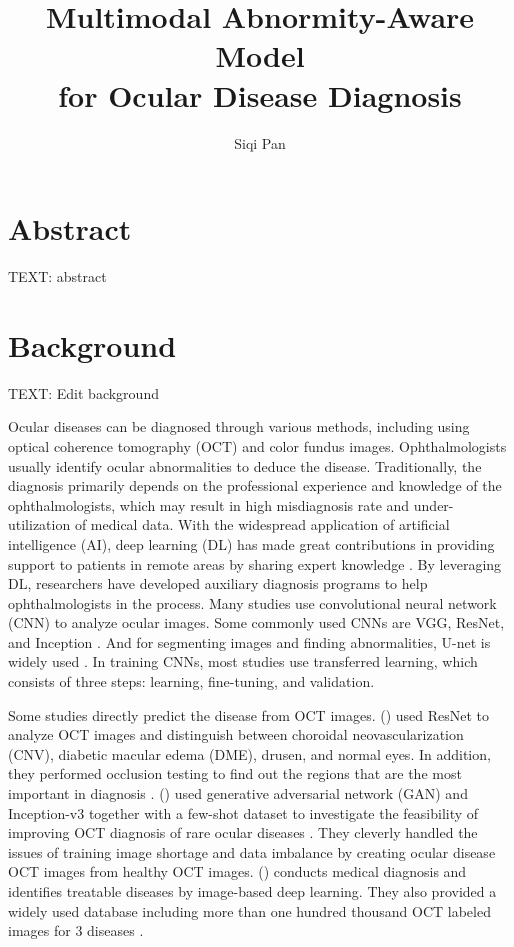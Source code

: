 \documentclass{article}
\newcommand{\authyear}[1]{\citeauthor{#1} (\citeyear{#1})}
\begin{document}
	\title{\vspace{-2.25cm} Multimodal Abnormity-Aware Model\\for Ocular Disease Diagnosis}
	\author{Siqi Pan}
	\date{}
	\maketitle
	
	\section*{Abstract}
	
	TEXT: abstract
	
	\section{Background}
	
	TEXT: Edit background
	
	Ocular diseases can be diagnosed through various methods, including using optical coherence tomography (OCT) and color fundus images. Ophthalmologists usually identify ocular abnormalities to deduce the disease. Traditionally, the diagnosis primarily depends on the professional experience and knowledge of the ophthalmologists, which may result in high misdiagnosis rate and under-utilization of medical data. With the widespread application of artificial intelligence (AI), deep learning (DL) has made great contributions in providing support to patients in remote areas by sharing expert knowledge \autocite{Ichhpujani_Thakur_2021}. By leveraging DL, researchers have developed auxiliary diagnosis programs to help ophthalmologists in the process. Many studies use convolutional neural network (CNN) to analyze ocular images. Some commonly used CNNs are VGG, ResNet, and Inception \autocite{daich2023artificial}. And for segmenting images and finding abnormalities, U-net is widely used \autocite{Ronneberger_Fischer_Brox_2015}. In training CNNs, most studies use transferred learning, which consists of three steps: learning, fine-tuning, and validation.
	
	Some studies directly predict the disease from OCT images.
	\authyear{li2019deep} used ResNet to analyze OCT images and distinguish between choroidal neovascularization (CNV), diabetic macular edema (DME), drusen, and normal eyes. In addition, they performed occlusion testing to find out the regions that are the most important in diagnosis \autocite{li2019deep}. 
	\authyear{yoo2021feasibility} used generative adversarial network (GAN) and Inception-v3 together with a few-shot dataset to investigate the feasibility of improving OCT diagnosis of rare ocular diseases \autocite{yoo2021feasibility}. They cleverly handled the issues of training image shortage and data imbalance by creating ocular disease OCT images from healthy OCT images. \authyear{Kermany2018} conducts medical diagnosis and identifies treatable diseases by image-based deep learning. They also provided a widely used database including more than one hundred thousand OCT labeled images for 3 diseases \autocite{Kermany2018}.
	
\end{document}
